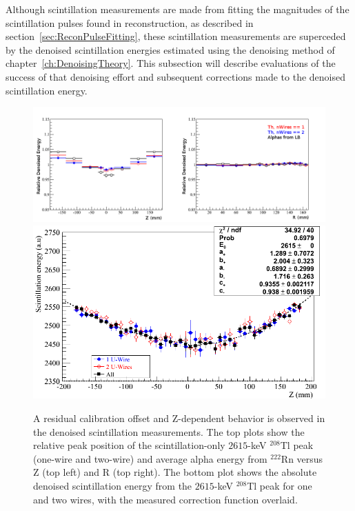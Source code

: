 Although scintillation measurements are made from fitting the magnitudes of the scintillation pulses found in reconstruction, as described in section~\ref{sec:ReconPulseFitting}, these scintillation measurements are superceded by the denoised scintillation energies estimated using the denoising method of chapter~\ref{ch:DenoisingTheory}.  This subsection will describe evaluations of the success of that denoising effort and subsequent corrections made to the denoised scintillation energy.

\begin{figure}
\begin{center}
\includegraphics[keepaspectratio=true,width=\textwidth]{DenoisedScintillatonRelativeRZBias.png}
\includegraphics[keepaspectratio=true,width=\textwidth]{DenoisedScintillatonZBias.png}
\end{center}
\renewcommand{\baselinestretch}{1}
\small\normalsize
\begin{quote}
\caption{A residual calibration offset and Z-dependent behavior is observed in the denoised scintillation measurements.  The top plots show the relative peak position of the scintillation-only $2615$-keV $^{208}$Tl peak (one-wire and two-wire) and average alpha energy from $^{222}$Rn versus Z (top left) and R (top right).  The bottom plot shows the absolute denoised scintillation energy from the $2615$-keV $^{208}$Tl peak for one and two wires, with the measured correction function overlaid.~\cite{EnergyDocumentRun2ab}}
\label{fig:ResidualLightZBias}
\end{quote}
\end{figure}
\renewcommand{\baselinestretch}{2}
\small\normalsize

